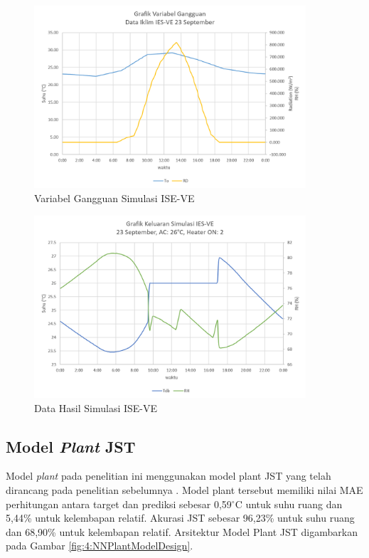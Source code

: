 \begin{figure}[!h]
	\centering
	\includegraphics[width=0.9\textwidth]{figures/LoadSimulasiIESVE}
	\caption{Variabel Gangguan Simulasi ISE-VE}
	\label{fig:4:LoadSimulasiIESVE}
\end{figure}
\vspace{1em}
\hfill\break

\begin{figure}[!h]
	\centering
	\includegraphics[width=0.9\textwidth]{figures/HasilSimulasiIESVE}
	\caption{Data Hasil Simulasi ISE-VE}
	\label{fig:4:HasilSimulasiIESVE}
\end{figure}
\vspace{1em}
\break

\subsection{Model \textit{Plant} JST}
Model \textit{plant} pada penelitian ini menggunakan model plant JST yang telah dirancang pada penelitian sebelumnya \cite{skripsiTanto}. Model plant tersebut memiliki nilai MAE perhitungan antara target dan prediksi sebesar 0,59$^{\circ}$C untuk suhu ruang dan 5,44\% untuk kelembapan relatif. Akurasi JST sebesar 96,23\% untuk suhu ruang dan 68,90\% untuk kelembapan relatif. Arsitektur Model Plant JST digambarkan pada Gambar \ref{fig:4:NNPlantModelDesign}.

